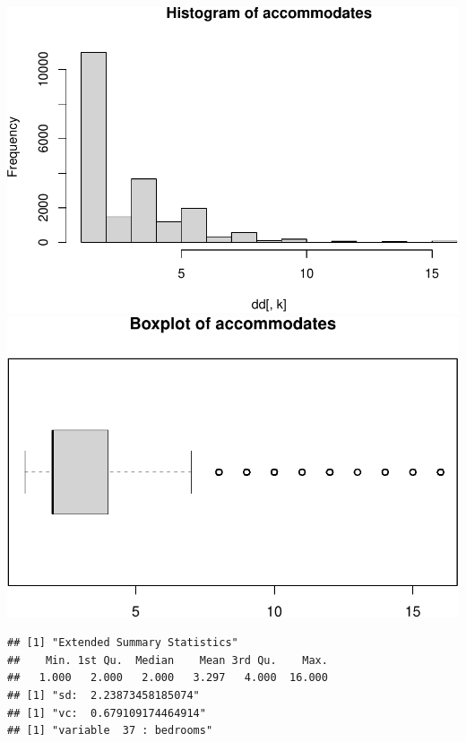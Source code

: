 \includegraphics{anal_files/figure-latex/unnamed-chunk-7-20.pdf}
\includegraphics{anal_files/figure-latex/unnamed-chunk-7-21.pdf}

\begin{verbatim}
## [1] "Extended Summary Statistics"
##    Min. 1st Qu.  Median    Mean 3rd Qu.    Max. 
##   1.000   2.000   2.000   3.297   4.000  16.000 
## [1] "sd:  2.23873458185074"
## [1] "vc:  0.679109174464914"
## [1] "variable  37 : bedrooms"
\end{verbatim}

